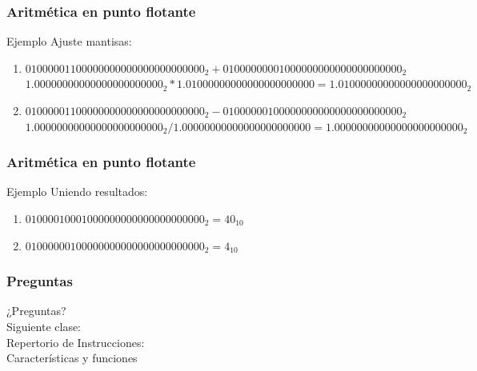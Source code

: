 \documentclass{beamer}
\begin{document}
\begin{frame}
	\frametitle{Aritmética en punto flotante}
	\begin{block}{Ejemplo}
	Ajuste mantisas:
	\begin{enumerate}
		\item $0 10000011 00000000000000000000000_{2} + 0 10000000 01000000000000000000000_{2}$ 
		\\ $1.00000000000000000000000_{2} * 1.01000000000000000000000 = 1.01000000000000000000000_{2}$
		\item $0 10000011 00000000000000000000000_{2} - 0 10000001 00000000000000000000000_{2}$
		\\ $1.00000000000000000000000_{2} / 1.00000000000000000000000 = 1.00000000000000000000000_{2}$
	\end{enumerate}	
	\end{block}
\end{frame}

\begin{frame}
	\frametitle{Aritmética en punto flotante}
	\begin{block}{Ejemplo}
	Uniendo resultados:
	\begin{enumerate}
		\item $0 10000100 01000000000000000000000_{2} = 40_{10}$ 
		\item $0 10000001 00000000000000000000000_{2} = 4_{10}$
	\end{enumerate}	
	\end{block}
\end{frame}

\begin{frame}
	\frametitle{Preguntas}
	\vfill
	\begin{center}
	¿Preguntas?\\
	\vfill
	Siguiente clase: \\
	Repertorio de Instrucciones: \\
	Características y funciones
	\end{center}
\end{frame}
\end{document}

